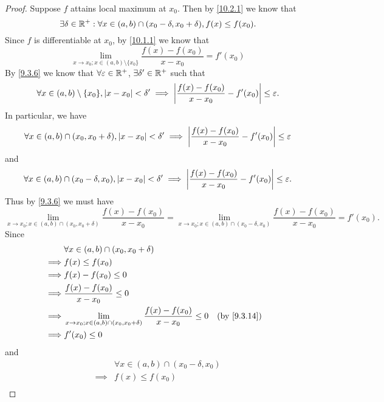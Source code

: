 \begin{proof}
  Suppose \(f\) attains local maximum at \(x_0\).
  Then by \cref{10.2.1} we know that
  \[
    \exists \delta \in \mathbb{R}^+ : \forall x \in (a, b) \cap (x_0 - \delta, x_0 + \delta), f(x) \leq f(x_0).
  \]
  Since \(f\) is differentiable at \(x_0\), by \cref{10.1.1} we know that
  \[
    \lim_{x \to x_0 ; x \in (a, b) \setminus \{x_0\}} \dfrac{f(x) - f(x_0)}{x - x_0} = f'(x_0)
  \]
  By \cref{9.3.6} we know that \(\forall \varepsilon \in \mathbb{R}^+\), \(\exists \delta' \in \mathbb{R}^+\) such that
  \[
    \forall x \in (a, b) \setminus \{x_0\}, \left\lvert x - x_0\right\rvert < \delta' \implies \left\lvert\dfrac{f(x) - f(x_0)}{x - x_0} - f'(x_0)\right\rvert \leq \varepsilon.
  \]
  In particular, we have
  \[
    \forall x \in (a, b) \cap (x_0, x_0 + \delta), \left\lvert x - x_0\right\rvert < \delta' \implies \left\lvert\dfrac{f(x) - f(x_0)}{x - x_0} - f'(x_0)\right\rvert \leq \varepsilon
  \]
  and
  \[
    \forall x \in (a, b) \cap (x_0 - \delta, x_0), \left\lvert x - x_0\right\rvert < \delta' \implies \left\lvert\dfrac{f(x) - f(x_0)}{x - x_0} - f'(x_0)\right\rvert \leq \varepsilon.
  \]
  Thus by \cref{9.3.6} we must have
  \[
    \lim_{x \to x_0 ; x \in (a, b) \cap (x_0, x_0 + \delta)} \dfrac{f(x) - f(x_0)}{x - x_0} = \lim_{x \to x_0 ; x \in (a, b) \cap (x_0 - \delta, x_0)} \dfrac{f(x) - f(x_0)}{x - x_0} = f'(x_0).
  \]
  Since
  \begin{align*}
             & \forall x \in (a, b) \cap (x_0, x_0 + \delta)                                                                   \\
    \implies & f(x) \leq f(x_0)                                                                                                \\
    \implies & f(x) - f(x_0) \leq 0                                                                                            \\
    \implies & \dfrac{f(x) - f(x_0)}{x - x_0} \leq 0                                                                           \\
    \implies & \lim_{x \to x_0 ; x \in (a, b) \cap (x_0, x_0 + \delta)} \dfrac{f(x) - f(x_0)}{x - x_0} \leq 0 &  & \by{9.3.14} \\
    \implies & f'(x_0) \leq 0
  \end{align*}
  and
  \begin{align*}
             & \forall x \in (a, b) \cap (x_0 - \delta, x_0)                                                                    \\
    \implies & f(x) \leq f(x_0)                                                                                                 \\

\end{align*}
\end{proof}
